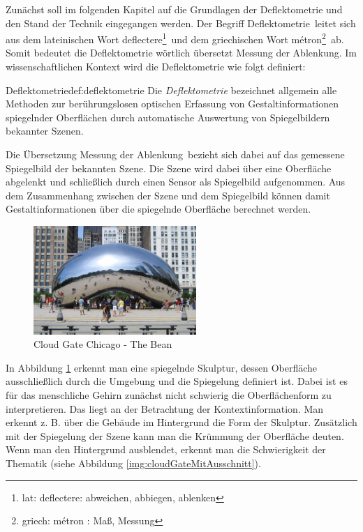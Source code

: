 Zunächst soll im folgenden Kapitel auf die Grundlagen der Deflektometrie und den Stand der Technik eingegangen werden.
Der Begriff \glqq Deflektometrie\grqq ~leitet sich aus dem lateinischen Wort \glqq deflectere\footnote{lat: deflectere: abweichen, abbiegen, ablenken}\grqq ~und dem griechischen Wort \glqq métron\footnote{griech: \textgreek{métron} : Maß, Messung}\grqq ~ab.
Somit bedeutet die Deflektometrie wörtlich übersetzt \glqq Messung der Ablenkung\grqq.
Im wissenschaftlichen Kontext wird die Deflektometrie wie folgt definiert:

\begin{Definition}{Deflektometrie}{def:deflektometrie}
	Die \textit{Deflektometrie} bezeichnet allgemein alle Methoden zur berührungslosen optischen Erfassung von Gestaltinformationen spiegelnder Oberflächen durch automatische Auswertung von Spiegelbildern bekannter Szenen. \cite{fraunhofer}
\end{Definition}

\noindent
Die Übersetzung \glqq Messung der Ablenkung\grqq ~bezieht sich dabei auf das gemessene Spiegelbild der bekannten Szene.
Die Szene wird dabei über eine Oberfläche abgelenkt und schließlich durch einen Sensor als Spiegelbild aufgenommen.
Aus dem Zusammenhang zwischen der Szene und dem Spiegelbild können damit Gestaltinformationen über die spiegelnde Oberfläche berechnet werden.

\begin{figure}[H]
	\centering
	\includegraphics[width=0.55\textwidth]{02_grundlagenZurDeflektometrie/figures/cloud-gate-chicago}
	\caption[Cloud Gate Chicaog - The Bean]{Cloud Gate Chicago - The Bean \cite{cloudGateChicago}}
	\label{img:cloudGateChicago}
\end{figure}

\noindent
In Abbildung \ref{img:cloudGateChicago} erkennt man eine spiegelnde Skulptur, dessen Oberfläche ausschließlich durch die Umgebung und die Spiegelung definiert ist.
Dabei ist es für das menschliche Gehirn zunächst nicht schwierig die Oberflächenform zu interpretieren.
Das liegt an der Betrachtung der Kontextinformation.
Man erkennt z. B. über die Gebäude im Hintergrund die Form der Skulptur.
Zusätzlich mit der Spiegelung der Szene kann man die Krümmung der Oberfläche deuten.
Wenn man den Hintergrund ausblendet, erkennt man die Schwierigkeit der Thematik (siehe Abbildung \ref{img:cloudGateMitAusschnitt}).

